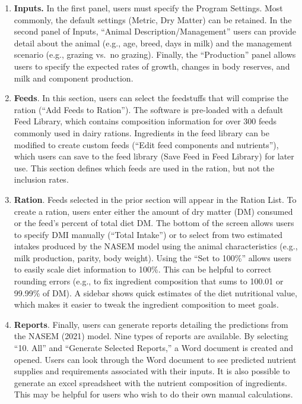\documentclass[
]{book}
\begin{document}
\begin{enumerate}
\def\labelenumi{\arabic{enumi}.}
\item
  \textbf{Inputs.} In the first panel, users must specify the Program Settings. Most commonly, the default settings (Metric, Dry Matter) can be retained. In the second panel of Inputs, ``Animal Description/Management'' users can provide detail about the animal (e.g., age, breed, days in milk) and the management scenario (e.g., grazing vs.~no grazing). Finally, the ``Production'' panel allows users to specify the expected rates of growth, changes in body reserves, and milk and component production.
\item
  \textbf{Feeds}. In this section, users can select the feedstuffs that will comprise the ration (``Add Feeds to Ration''). The software is pre-loaded with a default Feed Library, which contains composition information for over 300 feeds commonly used in dairy rations. Ingredients in the feed library can be modified to create custom feeds (``Edit feed components and nutrients''), which users can save to the feed library (Save Feed in Feed Library) for later use. This section defines which feeds are used in the ration, but not the inclusion rates.
\item
  \textbf{Ration}. Feeds selected in the prior section will appear in the Ration List. To create a ration, users enter either the amount of dry matter (DM) consumed or the feed's percent of total diet DM. The bottom of the screen allows users to specify DMI manually (``Total Intake'') or to select from two estimated intakes produced by the NASEM model using the animal characteristics (e.g., milk production, parity, body weight). Using the ``Set to 100\%'' allows users to easily scale diet information to 100\%. This can be helpful to correct rounding errors (e.g., to fix ingredient composition that sums to 100.01 or 99.99\% of DM). A sidebar shows quick estimates of the diet nutritional value, which makes it easier to tweak the ingredient composition to meet goals.
\item
  \textbf{Reports}. Finally, users can generate reports detailing the predictions from the NASEM (2021) model. Nine types of reports are available. By selecting ``10. All'' and ``Generate Selected Reports,'' a Word document is created and opened. Users can look through the Word document to see predicted nutrient supplies and requirements associated with their inputs. It is also possible to generate an excel spreadsheet with the nutrient composition of ingredients. This may be helpful for users who wish to do their own manual calculations.
\end{enumerate}
\end{document}
